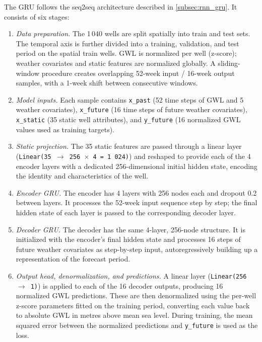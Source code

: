 The GRU follows the seq2seq architecture described in \cref{subsec:rnn_gru}.
It consists of six stages:
\begin{enumerate}[label=\textcircled{\small\arabic*}]
  \item \textit{Data preparation.} The 1\,040 wells are split spatially into train and test sets.
    The temporal axis is further divided into a training, validation, and test period on the spatial train wells.
    GWL is normalized per well (z-score); weather covariates and static features are normalized globally.
    A sliding-window procedure creates overlapping 52-week input / 16-week output samples, with a 1-week shift between consecutive windows.
  \item \textit{Model inputs.} Each sample contains \texttt{x\_past} (52 time steps of GWL and 5 weather covariates),
    \texttt{x\_future} (16 time steps of future weather covariates), \texttt{x\_static} (35 static well attributes),
    and \texttt{y\_future} (16 normalized GWL values used as training targets).
  \item \textit{Static projection.} The 35 static features are passed through a linear layer
    (\texttt{Linear(35 $\to$ 256\,$\times$\,4\,=\,1\,024)}) and reshaped to provide each of the 4 encoder layers
    with a dedicated 256-dimensional initial hidden state, encoding the identity and characteristics of the well.
  \item \textit{Encoder GRU.} The encoder has 4 layers with 256 nodes each and dropout 0.2 between layers.
    It processes the 52-week input sequence step by step; the final hidden state of each layer is passed to the corresponding decoder layer.
  \item \textit{Decoder GRU.} The decoder has the same 4-layer, 256-node structure.
    It is initialized with the encoder's final hidden state and processes 16 steps of future weather covariates as step-by-step input,
    autoregressively building up a representation of the forecast period.
  \item \textit{Output head, denormalization, and predictions.} A linear layer (\texttt{Linear(256 $\to$ 1)}) is applied
    to each of the 16 decoder outputs, producing 16 normalized GWL predictions.
    These are then denormalized using the per-well z-score parameters fitted on the training period,
    converting each value back to absolute GWL in metres above mean sea level.
    During training, the mean squared error between the normalized predictions and \texttt{y\_future} is used as the loss.
\end{enumerate}

